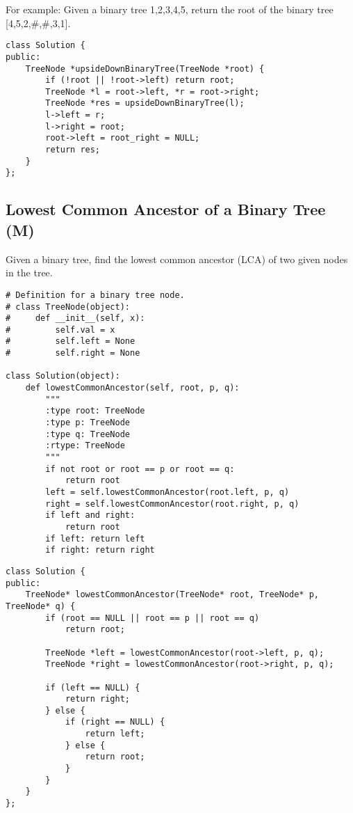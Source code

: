 For example:
Given a binary tree {1,2,3,4,5}, return the root of the binary tree [4,5,2,\#,\#,3,1]. \\

\begin{lstlisting}
class Solution {
public:
    TreeNode *upsideDownBinaryTree(TreeNode *root) {
        if (!root || !root->left) return root;
        TreeNode *l = root->left, *r = root->right;
        TreeNode *res = upsideDownBinaryTree(l);
        l->left = r;
        l->right = root;
        root->left = root_right = NULL;
        return res;
    }
};
\end{lstlisting}


\subsection{Lowest Common Ancestor of a Binary Tree (M)}
Given a binary tree, find the lowest common ancestor (LCA) of two given nodes in the tree. \\

\begin{lstlisting}
# Definition for a binary tree node.
# class TreeNode(object):
#     def __init__(self, x):
#         self.val = x
#         self.left = None
#         self.right = None

class Solution(object):
    def lowestCommonAncestor(self, root, p, q):
        """
        :type root: TreeNode
        :type p: TreeNode
        :type q: TreeNode
        :rtype: TreeNode
        """
        if not root or root == p or root == q:
            return root
        left = self.lowestCommonAncestor(root.left, p, q)
        right = self.lowestCommonAncestor(root.right, p, q)
        if left and right:
            return root
        if left: return left
        if right: return right
\end{lstlisting}

\begin{lstlisting}
class Solution {
public:
    TreeNode* lowestCommonAncestor(TreeNode* root, TreeNode* p, TreeNode* q) {
        if (root == NULL || root == p || root == q)
            return root;
        
        TreeNode *left = lowestCommonAncestor(root->left, p, q);
        TreeNode *right = lowestCommonAncestor(root->right, p, q);
        
        if (left == NULL) {
            return right;
        } else {
            if (right == NULL) {
                return left;
            } else {
                return root;
            }
        }
    }
};
\end{lstlisting}


